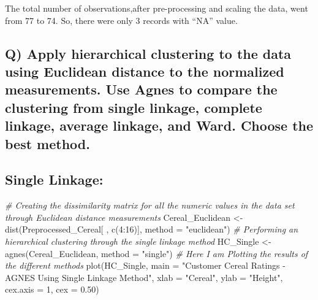 \documentclass[
]{article}
\newenvironment{Shaded}{\begin{snugshade}}{\end{snugshade}}
\newcommand{\AttributeTok}[1]{\textcolor[rgb]{0.77,0.63,0.00}{#1}}
\newcommand{\CommentTok}[1]{\textcolor[rgb]{0.56,0.35,0.01}{\textit{#1}}}
\newcommand{\DecValTok}[1]{\textcolor[rgb]{0.00,0.00,0.81}{#1}}
\newcommand{\FloatTok}[1]{\textcolor[rgb]{0.00,0.00,0.81}{#1}}
\newcommand{\FunctionTok}[1]{\textcolor[rgb]{0.00,0.00,0.00}{#1}}
\newcommand{\NormalTok}[1]{#1}
\newcommand{\OtherTok}[1]{\textcolor[rgb]{0.56,0.35,0.01}{#1}}
\newcommand{\SpecialCharTok}[1]{\textcolor[rgb]{0.00,0.00,0.00}{#1}}
\newcommand{\StringTok}[1]{\textcolor[rgb]{0.31,0.60,0.02}{#1}}
\begin{document}
The total number of observations,after pre-processing and scaling the
data, went from 77 to 74. So, there were only 3 records with ``NA''
value.

\hypertarget{q-apply-hierarchical-clustering-to-the-data-using-euclidean-distance-to-the-normalized-measurements.-use-agnes-to-compare-the-clustering-from-single-linkage-complete-linkage-average-linkage-and-ward.-choose-the-best-method.}{%
\subsection{Q) Apply hierarchical clustering to the data using Euclidean
distance to the normalized measurements. Use Agnes to compare the
clustering from single linkage, complete linkage, average linkage, and
Ward. Choose the best
method.}\label{q-apply-hierarchical-clustering-to-the-data-using-euclidean-distance-to-the-normalized-measurements.-use-agnes-to-compare-the-clustering-from-single-linkage-complete-linkage-average-linkage-and-ward.-choose-the-best-method.}}

\hypertarget{single-linkage}{%
\subsection{Single Linkage:}\label{single-linkage}}

\begin{Shaded}
\begin{Highlighting}[]
\CommentTok{\# Creating the dissimilarity matrix for all the numeric values in the data set through Euclidean distance measurements}
\NormalTok{Cereal\_Euclidean }\OtherTok{\textless{}{-}} \FunctionTok{dist}\NormalTok{(Preprocessed\_Cereal[ , }\FunctionTok{c}\NormalTok{(}\DecValTok{4}\SpecialCharTok{:}\DecValTok{16}\NormalTok{)], }\AttributeTok{method =} \StringTok{"euclidean"}\NormalTok{)}
\CommentTok{\# Performing an  hierarchical clustering through the single linkage method}
\NormalTok{HC\_Single }\OtherTok{\textless{}{-}} \FunctionTok{agnes}\NormalTok{(Cereal\_Euclidean, }\AttributeTok{method =} \StringTok{"single"}\NormalTok{)}
\CommentTok{\# Here I am Plotting the results of the different methods}
\FunctionTok{plot}\NormalTok{(HC\_Single, }
     \AttributeTok{main =} \StringTok{"Customer Cereal Ratings {-} AGNES Using  Single Linkage Method"}\NormalTok{,}
     \AttributeTok{xlab =} \StringTok{"Cereal"}\NormalTok{,}
     \AttributeTok{ylab =} \StringTok{"Height"}\NormalTok{,}
     \AttributeTok{cex.axis =} \DecValTok{1}\NormalTok{,}
     \AttributeTok{cex =} \FloatTok{0.50}\NormalTok{)}
\end{Highlighting}
\end{Shaded}
\end{document}
